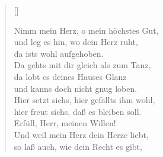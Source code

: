 \begin{center}
\settowidth{\versewidth}{Nimm mein Herz, o mein höchstes Gut,}
\begin{verse}[\versewidth]

 Nimm mein Herz, o mein höchstes Gut,\\
und leg es hin, wo dein Herz ruht,\\
da ists wohl aufgehoben.\\
Da gehts mit dir gleich als zum Tanz,\\
da lobt es deines Hauses Glanz\\
und kanns doch nicht gnug loben.\\
Hier setzt sichs, hier gefällts ihm wohl,\\
hier freut sichs, daß es bleiben soll.\\
Erfüll, Herr, meinen Willen!\\
Und weil mein Herz dein Herze liebt,\\
so laß auch, wie dein Recht es gibt,


\end{verse}
\end{center}






